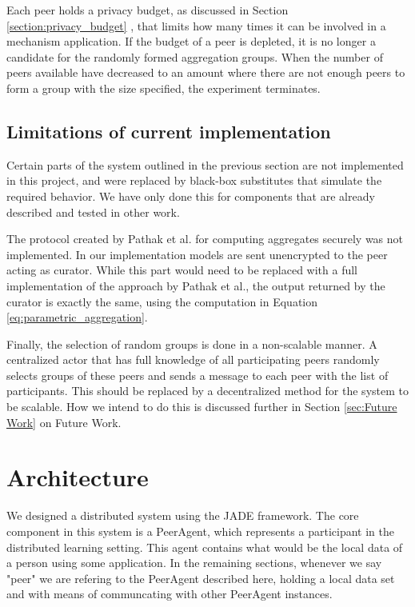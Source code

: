 Each peer holds a privacy budget, as discussed in Section \ref{section:privacy_budget} , that limits how many times it can be involved in a mechanism application. If the budget of a peer is depleted, it is no longer a candidate for the randomly formed aggregation groups. When the number of peers available have decreased to an amount where there are not enough peers to form a group with the size specified, the experiment terminates.

\subsection{Limitations of current implementation}

Certain parts of the system outlined in the previous section are not implemented in this project, and were replaced by black-box substitutes that simulate the required behavior. We have only done this for components that are already described and tested in other work. 

The protocol created by Pathak et al. for computing aggregates securely was not implemented. In our implementation models are sent unencrypted to the peer acting as curator. While this part would need to be replaced with a full implementation of the approach by Pathak et al., the output returned by the curator is exactly the same, using the computation in Equation \ref{eq:parametric_aggregation}. 

Finally, the selection of random groups is done in a non-scalable manner. A centralized actor that has full knowledge of all participating peers randomly selects groups of these peers and sends a message to each peer with the list of participants. This should be replaced by a decentralized method for the system to be scalable. How we intend to do this is discussed further in Section \ref{sec:Future Work} on Future Work.


\section{Architecture} \label{sec:architecture}

We designed a distributed system using the JADE framework. The core component in this system is a PeerAgent, which represents a participant in the distributed learning setting. This agent contains what would be the local data of a person using some application. In the remaining sections, whenever we say "peer" we are refering to the PeerAgent described here, holding a local data set and with means of communcating with other PeerAgent instances.


